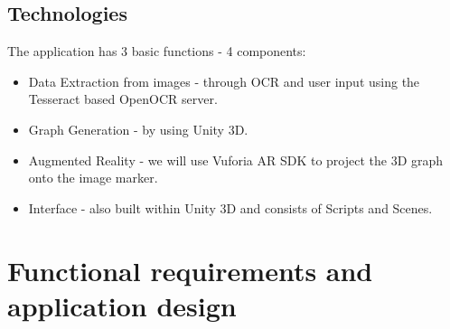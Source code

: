 \documentclass[a4paper,12pt]{article}
\begin{document}
\subsection{Technologies}
The application has 3 basic functions - 4 components:
\begin{itemize}
	\item Data Extraction from images - through OCR and user input using the Tesseract based OpenOCR server.
	\item Graph Generation - by using Unity 3D.
	\item Augmented Reality - we will use Vuforia AR SDK to project the 3D graph onto the image marker.
	\item Interface - also built within Unity 3D and consists of Scripts and Scenes.	
\end{itemize}

\newpage
\section{Functional requirements and application design}
\end{document}
